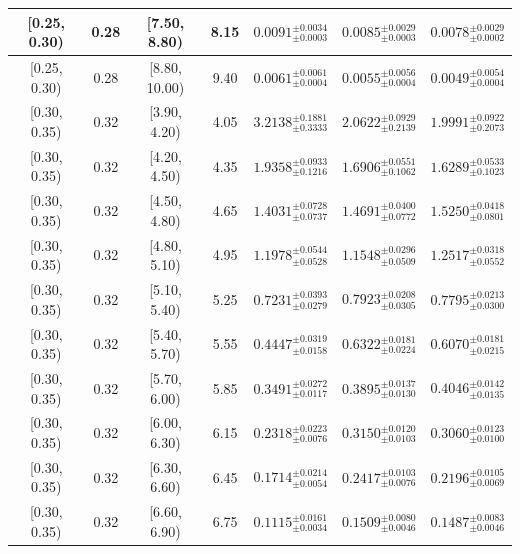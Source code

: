 \begin{longtable}{|c|c|c|c|c|c|c|}
\hline
[0.25, 0.30) & 0.28 & [7.50, 8.80) & 8.15 & $0.0091^{ \pm 0.0034 }_{ \pm 0.0003 }$ & $0.0085^{ \pm 0.0029 }_{ \pm 0.0003 }$ & $0.0078^{ \pm 0.0029 }_{ \pm 0.0002 }$ \\ 
\hline
[0.25, 0.30) & 0.28 & [8.80, 10.00) & 9.40 & $0.0061^{ \pm 0.0061 }_{ \pm 0.0004 }$ & $0.0055^{ \pm 0.0056 }_{ \pm 0.0004 }$ & $0.0049^{ \pm 0.0054 }_{ \pm 0.0004 }$ \\ 
\hline
[0.30, 0.35) & 0.32 & [3.90, 4.20) & 4.05 & $3.2138^{ \pm 0.1881 }_{ \pm 0.3333 }$ & $2.0622^{ \pm 0.0929 }_{ \pm 0.2139 }$ & $1.9991^{ \pm 0.0922 }_{ \pm 0.2073 }$ \\ 
\hline
[0.30, 0.35) & 0.32 & [4.20, 4.50) & 4.35 & $1.9358^{ \pm 0.0933 }_{ \pm 0.1216 }$ & $1.6906^{ \pm 0.0551 }_{ \pm 0.1062 }$ & $1.6289^{ \pm 0.0533 }_{ \pm 0.1023 }$ \\ 
\hline
[0.30, 0.35) & 0.32 & [4.50, 4.80) & 4.65 & $1.4031^{ \pm 0.0728 }_{ \pm 0.0737 }$ & $1.4691^{ \pm 0.0400 }_{ \pm 0.0772 }$ & $1.5250^{ \pm 0.0418 }_{ \pm 0.0801 }$ \\ 
\hline
[0.30, 0.35) & 0.32 & [4.80, 5.10) & 4.95 & $1.1978^{ \pm 0.0544 }_{ \pm 0.0528 }$ & $1.1548^{ \pm 0.0296 }_{ \pm 0.0509 }$ & $1.2517^{ \pm 0.0318 }_{ \pm 0.0552 }$ \\ 
\hline
[0.30, 0.35) & 0.32 & [5.10, 5.40) & 5.25 & $0.7231^{ \pm 0.0393 }_{ \pm 0.0279 }$ & $0.7923^{ \pm 0.0208 }_{ \pm 0.0305 }$ & $0.7795^{ \pm 0.0213 }_{ \pm 0.0300 }$ \\ 
\hline
[0.30, 0.35) & 0.32 & [5.40, 5.70) & 5.55 & $0.4447^{ \pm 0.0319 }_{ \pm 0.0158 }$ & $0.6322^{ \pm 0.0181 }_{ \pm 0.0224 }$ & $0.6070^{ \pm 0.0181 }_{ \pm 0.0215 }$ \\ 
\hline
[0.30, 0.35) & 0.32 & [5.70, 6.00) & 5.85 & $0.3491^{ \pm 0.0272 }_{ \pm 0.0117 }$ & $0.3895^{ \pm 0.0137 }_{ \pm 0.0130 }$ & $0.4046^{ \pm 0.0142 }_{ \pm 0.0135 }$ \\ 
\hline
[0.30, 0.35) & 0.32 & [6.00, 6.30) & 6.15 & $0.2318^{ \pm 0.0223 }_{ \pm 0.0076 }$ & $0.3150^{ \pm 0.0120 }_{ \pm 0.0103 }$ & $0.3060^{ \pm 0.0123 }_{ \pm 0.0100 }$ \\ 
\hline
[0.30, 0.35) & 0.32 & [6.30, 6.60) & 6.45 & $0.1714^{ \pm 0.0214 }_{ \pm 0.0054 }$ & $0.2417^{ \pm 0.0103 }_{ \pm 0.0076 }$ & $0.2196^{ \pm 0.0105 }_{ \pm 0.0069 }$ \\ 
\hline
[0.30, 0.35) & 0.32 & [6.60, 6.90) & 6.75 & $0.1115^{ \pm 0.0161 }_{ \pm 0.0034 }$ & $0.1509^{ \pm 0.0080 }_{ \pm 0.0046 }$ & $0.1487^{ \pm 0.0083 }_{ \pm 0.0046 }$ \\ 
\hline

\end{longtable}
